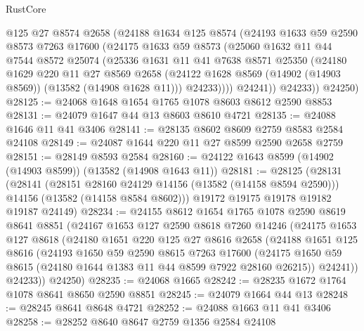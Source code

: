 \begin{lexlean}{RustCore}
\begin{coremodule}
          @125
          @27
          @8574
          @2658
          (@24188
            @1634
            @125
            @8574
            (@24193
              @1633
              @59
              @2590
              @8573
              @7263
              @17600
              (@24175
                @1633
                @59
                @8573
                (@25060
                  @1632
                  @11
                  @44
                  @7544
                  @8572
                  @25074
                  (@25336
                    @1631
                    @11
                    @41
                    @7638
                    @8571
                    @25350
                    (@24180
                      @1629
                      @220
                      @11
                      @27
                      @8569
                      @2658
                      (@24122 @1628 @8569 (@14902 (@14903 @8569)) (@13582 (@14908 @1628 @11)))
                      @24233))))
              @24241))
          @24233))
      @24250)
@28125 := @24068 @1648 @1654 @1765 @1078 @8603 @8612 @2590 @8853
@28131 := @24079 @1647 @44 @13 @8603 @8610 @4721
@28135 := @24088 @1646 @11 @41 @3406
@28141 := @28135 @8602 @8609 @2759 @8583 @2584 @24108
@28149 := @24087 @1644 @220 @11 @27 @8599 @2590 @2658 @2759
@28151 := @28149 @8593 @2584
@28160 := @24122 @1643 @8599 (@14902 (@14903 @8599)) (@13582 (@14908 @1643 @11))
@28181 := @28125
    (@28131
      (@28141
        (@28151 @28160 @24129 @14156 (@13582 (@14158 @8594 @2590)))
        @14156
        (@13582 (@14158 @8584 @8602)))
      @19172
      @19175
      @19178
      @19182
      @19187
      @24149)
@28234 := @24155
    @8612
    @1654
    @1765
    @1078
    @2590
    @8619
    @8641
    @8851
    (@24167
      @1653
      @127
      @2590
      @8618
      @7260
      @14246
      (@24175
        @1653
        @127
        @8618
        (@24180
          @1651
          @220
          @125
          @27
          @8616
          @2658
          (@24188
            @1651
            @125
            @8616
            (@24193
              @1650
              @59
              @2590
              @8615
              @7263
              @17600
              (@24175 @1650 @59 @8615 (@24180 @1644 @1383 @11 @44 @8599 @7922 @28160 @26215))
              @24241))
          @24233))
      @24250)
@28235 := @24068 @1665
@28242 := @28235 @1672 @1764 @1078 @8641 @8650 @2590 @8851
@28245 := @24079 @1664 @44 @13
@28248 := @28245 @8641 @8648 @4721
@28252 := @24088 @1663 @11 @41 @3406
@28258 := @28252 @8640 @8647 @2759 @1356 @2584 @24108

\end{coremodule}
\end{lexlean}
